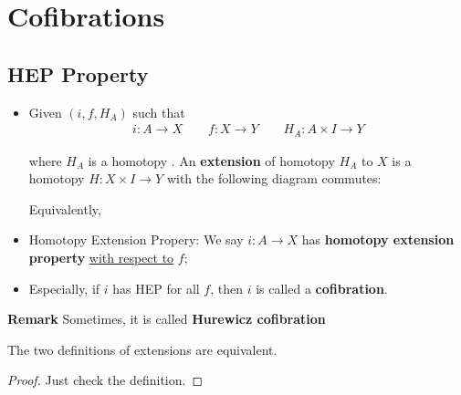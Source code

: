 \documentclass[Total.tex]{subfiles}
\begin{document}
		\section{Cofibrations}
			\subsection{HEP Property}
				\begin{Def}
					\begin{itemize}
						\item 
						Given $(i,f,H_A)$ such that
						\begin{gather*}
							i:A\rightarrow X\qquad f:X\rightarrow Y\qquad H_A:A\times I\rightarrow Y
						\end{gather*}
						
						where $H_A$ is a homotopy . An \textbf{extension} of homotopy $H_A$ to $X$ is a homotopy $H:X\times I\rightarrow Y$ with the following diagram commutes:
						\begin{center}
						\end{center}
						
						Equivalently,
						\begin{center}
						\end{center}
						\item Homotopy Extension Propery: We say $i:A\rightarrow X$ has \textbf{homotopy extension property} \underline{with respect to} $f$;
						\item Especially, if $i$ has HEP for all $f$, then $i$ is called a \textbf{cofibration}.
					\end{itemize}
				\end{Def}
				
				\textbf{Remark} Sometimes, it is called \textbf{Hurewicz cofibration}
				
				\begin{proposition}
					The two definitions of extensions are equivalent.
				\end{proposition}
				\begin{proof}
					Just check the definition.
				\end{proof}
				
\end{document}
